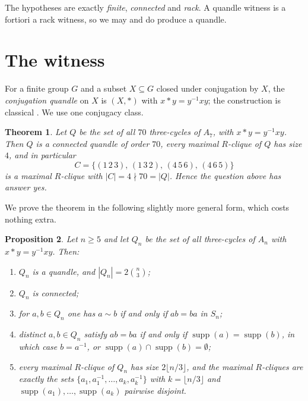 \documentclass[11pt]{amsart}
\newtheorem{theorem}{Theorem}
\newtheorem{proposition}[theorem]{Proposition}
\theoremstyle{definition}
\theoremstyle{remark}
\DeclareMathOperator{\supp}{supp}
\begin{document}
The hypotheses are exactly \emph{finite}, \emph{connected} and \emph{rack}. A
quandle witness is a fortiori a rack witness, so we may and do produce a
quandle.

\section{The witness}

For a finite group $G$ and a subset $X\subseteq G$ closed under conjugation by
$X$, the \emph{conjugation quandle} on $X$ is $(X,*)$ with $x*y=y^{-1}xy$; the
construction is classical \cite{Joyce,Matveev}. We use one conjugacy class.

\begin{theorem}\label{thm:main}
Let $Q$ be the set of all $70$ three-cycles of $A_7$, with $x*y=y^{-1}xy$.
Then $Q$ is a connected quandle of order $70$, every maximal $R$-clique of $Q$
has size $4$, and in particular
\[
  C=\{(1\,2\,3),\,(1\,3\,2),\,(4\,5\,6),\,(4\,6\,5)\}
\]
is a maximal $R$-clique with $|C|=4\nmid 70=|Q|$. Hence the question above has
answer \emph{yes}.
\end{theorem}

We prove the theorem in the following slightly more general form, which costs
nothing extra.

\begin{proposition}\label{prop:gen}
Let $n\ge5$ and let $Q_n$ be the set of all three-cycles of $A_n$ with
$x*y=y^{-1}xy$. Then:
\begin{enumerate}
\item[(a)] $Q_n$ is a quandle, and $|Q_n|=2\binom n3$;
\item[(b)] $Q_n$ is connected;
\item[(c)] for $a,b\in Q_n$ one has $a\sim b$ if and only if $ab=ba$ in $S_n$;
\item[(d)] distinct $a,b\in Q_n$ satisfy $ab=ba$ if and only if
$\supp(a)=\supp(b)$, in which case $b=a^{-1}$, or
$\supp(a)\cap\supp(b)=\emptyset$;
\item[(e)] every maximal $R$-clique of $Q_n$ has size $2\lfloor n/3\rfloor$,
and the maximal $R$-cliques are exactly the sets
$\{a_1,a_1^{-1},\dots,a_k,a_k^{-1}\}$ with $k=\lfloor n/3\rfloor$ and
$\supp(a_1),\dots,\supp(a_k)$ pairwise disjoint.
\end{enumerate}
\end{proposition}
\end{document}
